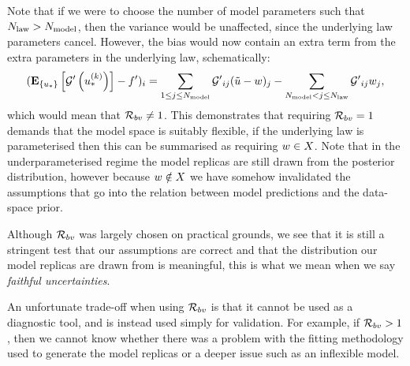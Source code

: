 Note that if we were to choose the number of model parameters such that $N_{\rm law} >
N_{\rm model}$, then the variance would be unaffected, since the underlying law
parameters cancel. However, the bias would now contain an extra term from the
extra parameters in the underlying law, schematically:
\begin{equation}
    \begin{split}
        (\mathbf{E}_{\{ u_* \}} \left[ {{\mathcal{G}}^{\prime}}\left(u_*^{(k)}\right) \right] - {{f}^{\prime}})_i =
        \sum_{1 \leq j \leq N_{\rm model}} {{\mathcal{G}}^{\prime}}_{ij} (\tilde{u} - w)_j -
        \sum_{N_{\rm model} < j \leq N_{\rm law}} {{\mathcal{G}}^{\prime}}_{ij} w_j,
    \end{split}
\end{equation}
which would mean that $\mathcal{R}_{bv} \neq 1$. This demonstrates that requiring
$\mathcal{R}_{bv} = 1$ demands that the model space is suitably flexible, if the
underlying law is parameterised then this can be summarised as requiring
$w \in X$. Note that in the underparameterised regime the
model replicas are still drawn from the posterior distribution, however because
$w \notin X$ we have somehow invalidated the assumptions that
go into the relation between model predictions and the data-space prior.

Although $\mathcal{R}_{bv}$ was largely chosen on practical grounds, we see that it
is still a stringent test that our assumptions are correct and that the
distribution our model replicas are drawn from is meaningful, this is what we
mean when we say {\em faithful uncertainties}.

An unfortunate trade-off when using $\mathcal{R}_{bv}$ is that it cannot be used as
a diagnostic tool, and is instead used simply for validation. For example, if
$\mathcal{R}_{bv} > 1$, then we cannot know whether there was a problem with the
fitting methodology used to generate the model replicas or a deeper issue such
as an inflexible model.

